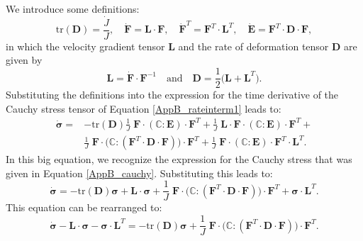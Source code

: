 We introduce some definitions:
\begin{equation}
\text{tr}(\boldsymbol{D}) = \frac{\dot{J}}{J}, \quad \dot{\boldsymbol{F}}=\boldsymbol{L}\cdot\boldsymbol{F},\quad \dot{\boldsymbol{F}}^T=\boldsymbol{F}^T\cdot\boldsymbol{L}^T,\quad \dot{\boldsymbol{E}}=\boldsymbol{F}^T\cdot\boldsymbol{D}\cdot\boldsymbol{F},
\end{equation}
in which the velocity gradient tensor $\boldsymbol{L}$ and the rate of deformation tensor $\boldsymbol{D}$ are given by
\begin{equation}
\boldsymbol{L}=\dot{\boldsymbol{F}}\cdot\boldsymbol{F}^{-1}\quad\text{and}\quad \boldsymbol{D}=\frac{1}{2}\Big(\boldsymbol{L}+\boldsymbol{L}^T\Big).
\end{equation}
Substituting the definitions into the expression for the time derivative of the Cauchy stress tensor of Equation \ref{AppB_rateinterm1} leads to:
\begin{equation}
\begin{split}
\dot{\boldsymbol{\sigma}} =& -\text{tr}(\boldsymbol{D})\frac{1}{J}\; \boldsymbol{F}\cdot(\boldsymbol{\mathbb C}:\boldsymbol{E})\cdot\boldsymbol{F}^T +\frac{1}{J}\;\boldsymbol{L}\cdot\boldsymbol{F}\cdot(\boldsymbol{\mathbb C}:\boldsymbol{E})\cdot\boldsymbol{F}^T +\\
&\frac{1}{J}\;\boldsymbol{F}\cdot\Big(\boldsymbol{\mathbb C}:(\boldsymbol{F}^T\cdot\boldsymbol{D}\cdot\boldsymbol{F})\Big)\cdot\boldsymbol{F}^T+\frac{1}{J}\;\boldsymbol{F}\cdot(\boldsymbol{\mathbb C}:\boldsymbol{E})\cdot\boldsymbol{F}^T\cdot\boldsymbol{L}^T.
\end{split}
\end{equation}
In this big equation, we recognize the expression for the Cauchy stress that was given in Equation \ref{AppB_cauchy}. Substituting this leads to:
\begin{equation}
\dot{\boldsymbol{\sigma}} = -\text{tr}(\boldsymbol{D})\boldsymbol{\sigma} +\boldsymbol{L}\cdot\boldsymbol{\sigma} + \frac{1}{J}\;\boldsymbol{F}\cdot\Big(\boldsymbol{\mathbb C}:(\boldsymbol{F}^T\cdot\boldsymbol{D}\cdot\boldsymbol{F})\Big)\cdot\boldsymbol{F}^T+\boldsymbol{\sigma}\cdot\boldsymbol{L}^T.
\end{equation}
This equation can be rearranged to:
\begin{equation}\label{AppB_rateinterm2}
\dot{\boldsymbol{\sigma}} - \boldsymbol{L}\cdot\boldsymbol{\sigma} - \boldsymbol{\sigma}\cdot\boldsymbol{L}^T = -\text{tr}(\boldsymbol{D})\boldsymbol{\sigma} + \frac{1}{J}\;\boldsymbol{F}\cdot\Big(\boldsymbol{\mathbb C}:(\boldsymbol{F}^T\cdot\boldsymbol{D}\cdot\boldsymbol{F})\Big)\cdot\boldsymbol{F}^T.
\end{equation}
